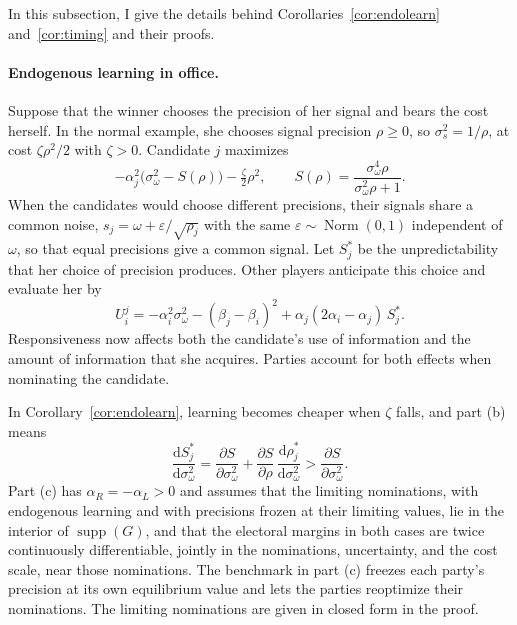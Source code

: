 \documentclass[12pt,letterpaper]{article}
\begin{document}
In this subsection, I give the details behind Corollaries~\ref{cor:endolearn} and~\ref{cor:timing} and their proofs.

\paragraph{Endogenous learning in office.}
Suppose that the winner chooses the precision of her signal and bears the cost herself. In the normal example, she chooses signal precision $\rho\ge0$, so $\sigma_s^2=1/\rho$, at cost $\zeta \rho^2/2$ with $\zeta>0$. Candidate $j$ maximizes
\[
-\alpha_j^2\big(\sigma_\omega^2-S(\rho)\big)-\tfrac{\zeta}{2}\rho^2,
\qquad
S(\rho)=\frac{\sigma_\omega^4\rho }{\sigma_\omega^2\rho+1}.
\]
When the candidates would choose different precisions, their signals share a common noise, $s_j=\omega+\varepsilon/\sqrt{\rho_j}$ with the same $\varepsilon\sim\operatorname{Norm}(0,1)$ independent of $\omega$, so that equal precisions give a common signal.
Let $S_j^*$ be the unpredictability that her choice of precision produces. Other players anticipate this choice and evaluate her by
\[
U_i^j=-\alpha_i^2\sigma_\omega^2-(\beta_j-\beta_i)^2+\alpha_j(2\alpha_i-\alpha_j)\,S_j^*.
\]
Responsiveness now affects both the candidate's use of information and the amount of information that she acquires. Parties account for both effects when nominating the candidate.

In Corollary~\ref{cor:endolearn}, learning becomes cheaper when $\zeta$ falls, and part (b) means
\[
\frac{\mathrm{d}S_j^*}{\mathrm{d}\sigma_\omega^2}=\frac{\partial S}{\partial \sigma_\omega^2}+\frac{\partial S}{\partial \rho }\,\frac{\mathrm{d}\rho_j^*}{\mathrm{d}\sigma_\omega^2}>\frac{\partial S}{\partial \sigma_\omega^2}.
\]
Part (c) has $\alpha_R=-\alpha_L>0$ and assumes that the limiting nominations, with endogenous learning and with precisions frozen at their limiting values, lie in the interior of $\operatorname{supp}(G)$, and that the electoral margins in both cases are twice continuously differentiable, jointly in the nominations, uncertainty, and the cost scale, near those nominations. The benchmark in part (c) freezes each party's precision at its own equilibrium value and lets the parties reoptimize their nominations. The limiting nominations are given in closed form in the proof.
\end{document}
